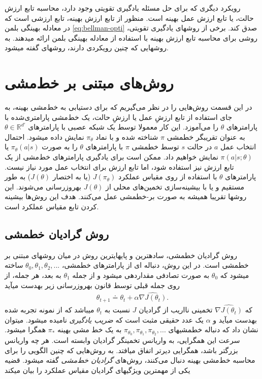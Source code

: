  رویکرد دیگری که برای حل مسئله یادگیری تقویتی وجود دارد، محاسبه تابع ارزش حالت، یا تابع ارزش عمل بهینه است. منظور از تابع ارزش بهینه، تابع ارزشی است که در معادله بهینگی بلمن 
 \ref{eq:bellman-opti}
 صدق کند. برخی از روش\nf های یادگیری تقویتی، روشی برای محاسبه تابع ارزش بهینه با استفاده از معادله بهینگی بلمن ارائه می\nf دهند. به روش\nf هایی که چنین رویکردی دارند، روش\nf های 
 \textit{
 	}
 گفته می\nf شود.

\section{روش‌های مبتنی بر خط‌مشی}
در این قسمت روش‌هایی را در نظر می‌گیریم که برای دستیابی به خط‌مشی بهینه، به جای استفاده از تابع ارزشِ عمل یا ارزشِ حالت، یک خط‌مشی پارامتری‌شده 
با پارامترهای $\theta$ را می‌آموزد.  این کار  معمولا توسط یک شبکه عصبی با پارامترهای 
$\theta \in \mathbb{R}^{d'}$
 به عنوان تقریب\nf گر خط\nf مشی 
$\pi$
شناخته شده و با نماد $\pi_\theta$ نمایش داده می\nf شود. احتمال انتخاب عمل $a$ در حالت $s$ توسط خط\nf مشی $\pi$ با پارامترهای $\theta$ را به صورت
$\pi_\theta(a|s)$
یا
$\pi(a|s;\theta)$
نمایش خواهیم داد.
ممکن است برای یادگیری پارامترهای خط‌مشی از یک تابع ارزش نیز استفاده شود، اما تابع ارزش برای انتخاب عمل مورد نیاز نیست. 
پارامترهای $\theta$ با استفاده از 
روی مقیاس عملکرد 
$J(\pi_\theta)$
(یا به اختصار $J(\theta)$)
به طور مستقیم و یا با بیشینه‌سازی تخمین‌های محلی از  $J(\theta)$ به\nf روزرسانی می‌شوند.
این روش\nf ها تقریبا همیشه به صورت بر-خط\nf مشی  عمل می‌کنند. 
 هدف این روش‌ها بیشینه کردن تابع مقیاس عملکرد است. 
 
 
 \subsection{روش گرادیان خط\nf مشی}
روش گرادیان خط\nf مشی، ساده\nf ترین و پایه\nf ای\nf ترین روش در میان روش\nf های مبتنی بر خط\nf مشی است. در این روش، دنباله\nf 
ای از پارامترهای خط\nf مشی، 
$\theta_0, \theta_1, \theta_2, ...$
ساخته می\nf شود که $\theta_0$ به صورت تصادفی مقداردهی می\nf شود و از جمله 
$\theta_1$
به بعد، هر جمله، از روی جمله قبلی توسط قانون به\nf روزرسانی زیر به\nf دست می\nf آید
\begin{align}
\theta_{t+1} \doteq \theta_t + \alpha \widehat{\nabla J(\theta_t)}.
\label{eq:updatepg}
\end{align}
که 
$\widehat{\nabla J(\theta_t)}$
تخمینی نااریب از گرادیان  $J$ نسبت به 
$\theta_t$
 می\nf باشد که از نمونه تجربه شده به\nf دست می\nf آید و $\alpha$ یک عدد حقیقی مثبت است که 
 \textit{ضریب یادگیری}
 نامیده می\nf شود. می\nf توان نشان داد که دنباله خط\nf مشی\nf های
 $\pi_{\theta_0}, \pi_{\theta_1}, \pi_{\theta_2}, ...$
 به یک خط مشی بهینه $\pi_*$ همگرا می\nf شود. سرعت این همگرایی، به واریانس تخمین\nf گر گرادیان وابسته است. هر چه واریانس بزرگتر باشد، همگرایی دیرتر اتفاق می\nf افتد. به روش‌هایی که چنین الگویی را برای محاسبه خط‌مشی بهینه دنبال می‌کنند، روش‌های 
\textit{گرادیان خط‌مشی}
 گفته می\nf شود. قضیه
 	یکی از مهم\nf ترین ویژگی\nf های گرادیان مقیاس عملکرد را بیان می\nf کند

